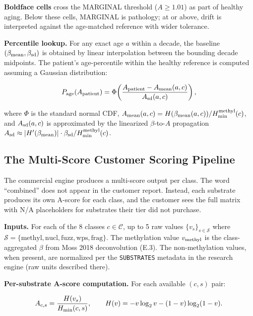 \documentclass[12pt,a4paper]{article}
\begin{document}
\textbf{Boldface cells} cross the MARGINAL threshold ($A \geq 1.01$)
as part of healthy aging. Below these cells, MARGINAL is pathology;
at or above, drift is interpreted against the age-matched reference
with wider tolerance.

\textbf{Percentile lookup.} For any exact age $a$ within a decade,
the baseline $(\beta_{\rm mean}, \beta_{\rm sd})$ is obtained by
linear interpolation between the bounding decade midpoints. The
patient's age-percentile within the healthy reference is computed
assuming a Gaussian distribution:

\begin{equation}
P_{\rm age}(A_{\rm patient}) = \Phi\!\left(\frac{A_{\rm patient} - A_{\rm mean}(a,c)}{A_{\rm sd}(a,c)}\right),
\label{eq:age_percentile}
\end{equation}

where $\Phi$ is the standard normal CDF,
$A_{\rm mean}(a,c) = H(\beta_{\rm mean}(a,c))/H_{\rm min}^{\rm methyl}(c)$,
and $A_{\rm sd}(a,c)$ is approximated by the linearized
$\beta$-to-$A$ propagation
$A_{\rm sd} \approx |H'(\beta_{\rm mean})|\cdot\beta_{\rm sd}/H_{\rm min}^{\rm methyl}(c)$.

\subsection{The Multi-Score Customer Scoring Pipeline}
\label{subsec:customer_scoring}

The commercial engine produces a multi-score output per class. The
word ``combined'' does not appear in the customer report. Instead,
each substrate produces its own A-score for each class, and the
customer sees the full matrix with N/A placeholders for substrates
their tier did not purchase.

\textbf{Inputs.} For each of the 8 classes $c \in \mathcal{C}$,
up to 5 raw values $\{v_s\}_{s \in \mathcal{S}}$ where
$\mathcal{S} = \{\mathrm{methyl}, \mathrm{nucl}, \mathrm{fuzz},
\mathrm{wps}, \mathrm{frag}\}$. The methylation value $v_{\rm methyl}$
is the class-aggregated $\beta$ from Moss 2018 deconvolution (E.3).
The non-methylation values, when present, are normalized per the
\texttt{SUBSTRATES} metadata in the research engine (raw units
described there).

\textbf{Per-substrate A-score computation.} For each available
$(c, s)$ pair:

\begin{equation}
A_{c,s} = \frac{H(v_s)}{H_{\rm min}(c,s)},
\qquad H(v) = -v\log_2 v - (1-v)\log_2(1-v).
\label{eq:per_sub_A}
\end{equation}
\end{document}
